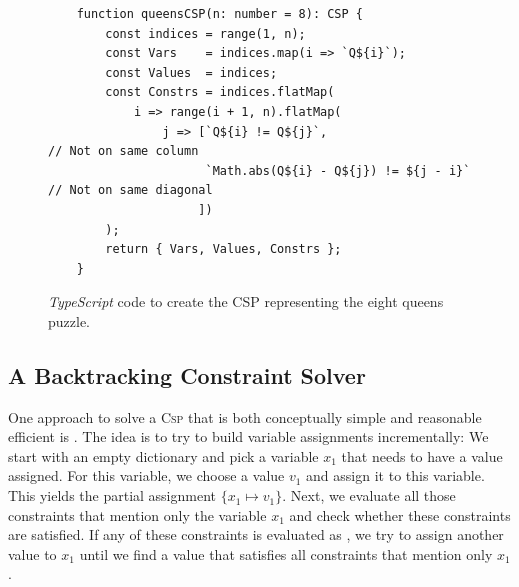 \begin{figure}[!ht]
\centering
\begin{verbatim}
    function queensCSP(n: number = 8): CSP {
        const indices = range(1, n);
        const Vars    = indices.map(i => `Q${i}`);
        const Values  = indices;
        const Constrs = indices.flatMap(
            i => range(i + 1, n).flatMap(
                j => [`Q${i} != Q${j}`,                       // Not on same column
                      `Math.abs(Q${i} - Q${j}) != ${j - i}`   // Not on same diagonal
                     ])
        );
        return { Vars, Values, Constrs };
    }
\end{verbatim}
\vspace*{-0.3cm}
\caption{\textsl{TypeScript} code to create the CSP representing the eight queens puzzle.}
\label{fig:queens-csp.stlx}
\end{figure}


\subsection{A Backtracking Constraint Solver}
One approach to solve a \textsc{Csp} that is both conceptually simple and reasonable efficient is
.  The idea is to try to build variable assignments incrementally:  We start with
an empty dictionary and pick a variable $x_1$ that needs to have a value assigned.  For this variable, we
choose a value $v_1$ and assign it to this variable.  This yields the partial assignment $\{ x_1 \mapsto v_1 \}$.
Next, we evaluate all those constraints that mention only the variable $x_1$ and check whether these constraints
are satisfied.  If any of these constraints is evaluated as , we try to assign another value to
$x_1$ until we find a value that satisfies all constraints that mention only $x_1$.

